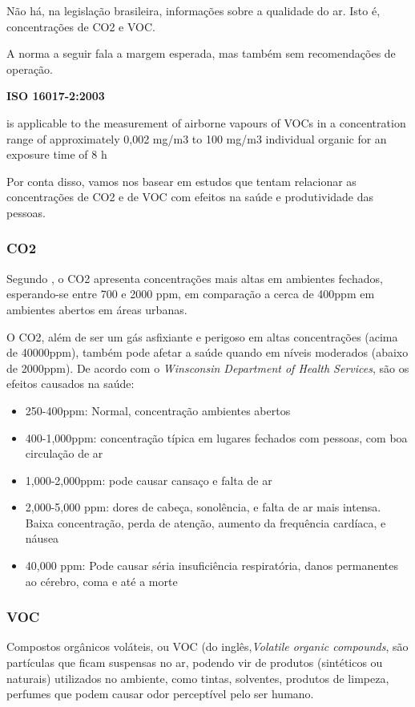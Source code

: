 \documentclass[../monografia.tex]{subfiles}
\begin{document}
Não há, na legislação brasileira, informações sobre a qualidade do ar. Isto é, concentrações de CO2 e VOC. 

A norma a seguir fala a margem esperada, mas também sem recomendações de operação. 

\begin{citacaoLonga} %
\textbf{ISO 16017-2:2003}

is applicable to the measurement of airborne vapours of VOCs in a concentration range of approximately 0,002 mg/m3 to 100 mg/m3 individual organic for an exposure time of 8 h
\end{citacaoLonga}

Por conta disso, vamos nos basear em estudos que tentam relacionar as concentrações de CO2 e de VOC com efeitos na saúde e produtividade das pessoas. 

\subsubsection{CO2}
Segundo \cite{AirQuality}, o CO2 apresenta concentrações mais altas em ambientes fechados, esperando-se entre 700 e 2000 ppm, em comparação a cerca de 400ppm em ambientes abertos em áreas urbanas\cite{co2Earth}. 

O CO2, além de ser um gás asfixiante e perigoso em altas concentrações (acima de 40000ppm), também pode afetar a saúde quando em níveis moderados (abaixo de 2000ppm). 
De acordo com o \textit{Winsconsin Department of Health Services}\cite{Winsconsin}, são os efeitos causados na saúde: 
\begin{itemize}
\item 250-400ppm: Normal, concentração ambientes abertos
\item 400-1,000ppm: concentração típica em lugares fechados com pessoas, com boa circulação de ar
\item 1,000-2,000ppm: pode causar cansaço e falta de ar
\item 2,000-5,000 ppm: dores de cabeça, sonolência, e falta de ar mais intensa. Baixa concentração, perda de atenção, aumento da frequência cardíaca, e náusea
\item 40,000 ppm: Pode causar séria insuficiência respiratória, danos permanentes ao cérebro, coma e até a morte
\end{itemize}

\subsubsection{VOC}
Compostos orgânicos voláteis, ou VOC (do inglês,\textit{Volatile organic compounds}, são partículas que ficam suspensas no ar, podendo vir de produtos (sintéticos ou naturais) utilizados no ambiente, como tintas, solventes, produtos de limpeza, perfumes que podem causar odor perceptível pelo ser humano\cite{AirQuality}.
\end{document}
